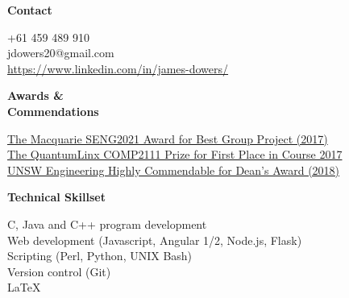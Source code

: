 \documentclass[a4paper]{article}
\newcommand{\mytitle}[1]{{\Large \textbf{#1}} \vspace{0.2cm}}
\begin{document}
\begin{minipage}[t]{0.2\linewidth}
\begin{flushleft}
    {
        \mytitle{Contact}
        
        +61 459 489 910 \\
        \smallskip
        jdowers20@gmail.com \\
        \smallskip
        \href{https://www.linkedin.com/in/james-dowers-823780116/}{https://www.linkedin.com/in/james-dowers/} 

    }
    \vspace{0.5cm}

    {
        \mytitle{Awards \&\\ Commendations}

        \href{https://www.engineering.unsw.edu.au/computer-science-engineering/computer-science-engineering/computer-science-engineering/computer-science-engineering/2017-winners}{The Macquarie SENG2021 Award for Best Group Project (2017)} \\
        
        \medskip
        \href{https://www.engineering.unsw.edu.au/computer-science-engineering/computer-science-engineering/computer-science-engineering/computer-science-engineering/2017-winners}{The QuantumLinx COMP2111 Prize for First Place in Course 2017}\\
        
        \medskip
        \href{https://www.engineering.unsw.edu.au/study-with-us/current-students/academic-information/awards-prizes/dean%E2%80%99s-honours-list/current-deans}{UNSW Engineering Highly Commendable for Dean's Award (2018)} \\
    }
    \vspace{0.5cm}
    
    {
        \mytitle{Technical Skillset}

        C, Java and C++ program development \\ 

        \medskip
        Web development (Javascript, Angular 1/2, Node.js, Flask) \\

        \medskip
        Scripting (Perl, Python, UNIX Bash) \\

        \medskip
        Version control (Git) \\

        \medskip
        {\large \LaTeX} \\
        
}
\end{flushleft}
\end{minipage}
\end{document}
